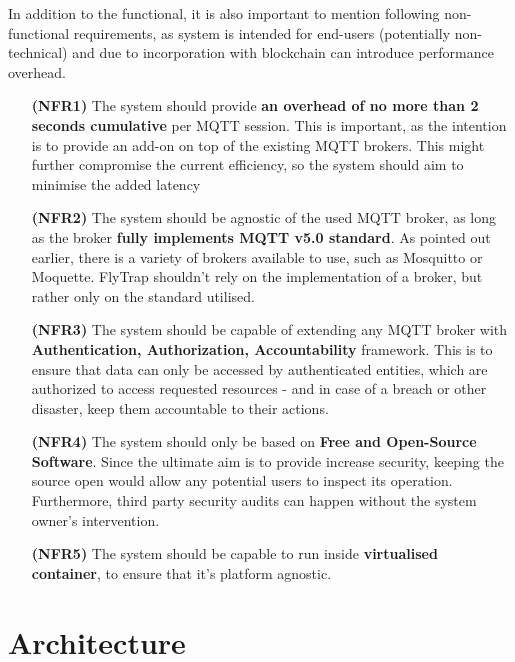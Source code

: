 In addition to the functional, it is also important to mention following non-functional requirements, as system is intended for end-users (potentially non-technical) and due to incorporation with blockchain can introduce performance overhead.

\begin{itemize}[leftmargin=4.5em]
\item[\textbf{(NFR1)}] The system should provide \textbf{an overhead of no more than 2 seconds cumulative} per MQTT session. This is important, as the intention is to provide an add-on on top of the existing MQTT brokers. This might further compromise the current efficiency, so the system should aim to minimise the added latency 
\item[\textbf{(NFR2)}] The system should be agnostic of the used MQTT broker, as long as the broker \textbf{fully implements MQTT v5.0 standard}. As pointed out earlier, there is a variety of brokers available to use, such as Mosquitto or Moquette. FlyTrap shouldn't rely on the implementation of a broker, but rather only on the standard utilised.
\item[\textbf{(NFR3)}] The system should be capable of extending any MQTT broker with \textbf{Authentication, Authorization, Accountability} framework. This is to ensure that data can only be accessed by authenticated entities, which are authorized to access requested resources - and in case of a breach or other disaster, keep them accountable to their actions.
\item[\textbf{(NFR4)}] The system should only be based on \textbf{Free and Open-Source Software}. Since the ultimate aim is to provide increase security, keeping the source open would allow any potential users to inspect its operation. Furthermore, third party security audits can happen without the system owner's intervention.
\item[\textbf{(NFR5)}] The system should be capable to run inside \textbf{virtualised container}, to ensure that it's platform agnostic.
\end{itemize}

\section{Architecture}
